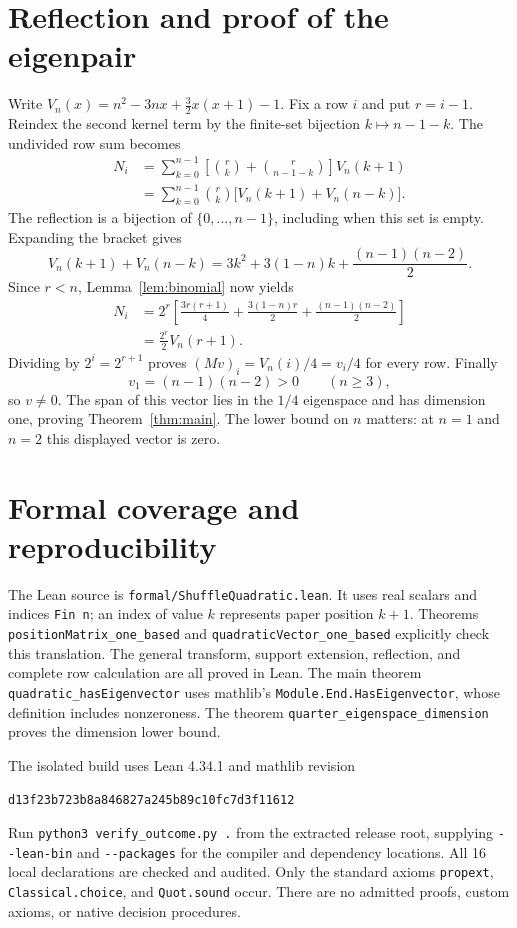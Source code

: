 \documentclass[11pt]{article}
\begin{document}
\section{Reflection and proof of the eigenpair}
Write $V_n(x)=n^2-3nx+\tfrac32x(x+1)-1$. Fix a row $i$ and put $r=i-1$. Reindex the second kernel term by the finite-set bijection $k\mapsto n-1-k$. The undivided row sum becomes
\begin{align*}
 N_i
 &=\sum_{k=0}^{n-1}\left[\binom rk+\binom r{n-1-k}\right]V_n(k+1)\\
 &=\sum_{k=0}^{n-1}\binom rk\bigl[V_n(k+1)+V_n(n-k)\bigr].
\end{align*}
The reflection is a bijection of $\{0,\ldots,n-1\}$, including when this set is empty. Expanding the bracket gives
\[
 V_n(k+1)+V_n(n-k)
 =3k^2+3(1-n)k+\frac{(n-1)(n-2)}2.
\]
Since $r<n$, Lemma~\ref{lem:binomial} now yields
\begin{align*}
 N_i&=2^r\left[\frac{3r(r+1)}4+\frac{3(1-n)r}2+\frac{(n-1)(n-2)}2\right]\\
 &=\frac{2^r}{2}V_n(r+1).
\end{align*}
Dividing by $2^i=2^{r+1}$ proves $(Mv)_i=V_n(i)/4=v_i/4$ for every row. Finally
\[
 v_1=(n-1)(n-2)>0\qquad(n\geq3),
\]
so $v\ne0$. The span of this vector lies in the $1/4$ eigenspace and has dimension one, proving Theorem~\ref{thm:main}. The lower bound on $n$ matters: at $n=1$ and $n=2$ this displayed vector is zero.

\section{Formal coverage and reproducibility}
The Lean source is \nolinkurl{formal/ShuffleQuadratic.lean}. It uses real scalars and indices \texttt{Fin n}; an index of value $k$ represents paper position $k+1$. Theorems \nolinkurl{positionMatrix_one_based} and \nolinkurl{quadraticVector_one_based} explicitly check this translation. The general transform, support extension, reflection, and complete row calculation are all proved in Lean. The main theorem \nolinkurl{quadratic_hasEigenvector} uses mathlib's \nolinkurl{Module.End.HasEigenvector}, whose definition includes nonzeroness. The theorem \nolinkurl{quarter_eigenspace_dimension} proves the dimension lower bound.

The isolated build uses Lean 4.34.1 and mathlib revision
\begin{center}\small\texttt{d13f23b723b8a846827a245b89c10fc7d3f11612}\end{center} Run \texttt{python3 verify\_outcome.py .} from the extracted release root, supplying \nolinkurl{--lean-bin} and \nolinkurl{--packages} for the compiler and dependency locations. All 16 local declarations are checked and audited. Only the standard axioms \nolinkurl{propext}, \nolinkurl{Classical.choice}, and \nolinkurl{Quot.sound} occur. There are no admitted proofs, custom axioms, or native decision procedures.
\end{document}
